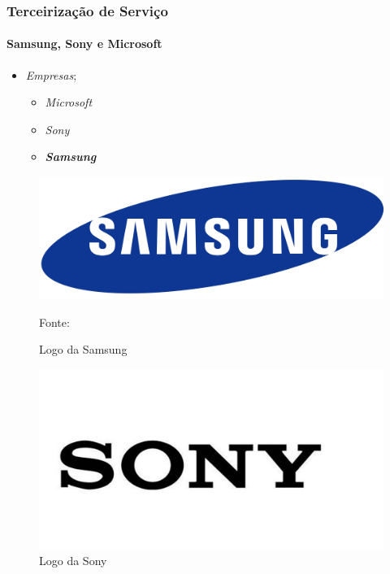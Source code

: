 \documentclass[aspectratio=169]{beamer}
\begin{document}
	\begin{frame}
		\frametitle{Terceirização de Serviço}
		\framesubtitle{Samsung, Sony e Microsoft}
		
		\begin{minipage}[!h]{.3\textwidth}
			\begin{itemize}
				\item \textit{Empresas};
				\begin{itemize}
					\item \textit{Microsoft}
					\item \textit{Sony}
					\item \textit{\textbf{Samsung}}
				\end{itemize}
			\end{itemize}
		\end{minipage}
		\hfill
		\begin{minipage}[!h]{.3\textwidth}
			\begin{figure}
				\centering
				\caption{Logo da Samsung}
				
				\includegraphics[width=.90\linewidth]{logo_samsung.png}
				
				\footnotesize{Fonte: }
				\label{logsam}
			\end{figure} 	 
		\end{minipage}
		\hfill	
		\begin{minipage}[!h]{.3\textwidth}
			\begin{figure}
				\centering
				\caption{Logo da Sony}
				
				\includegraphics[width=.65\linewidth]{logo_sony.png}
				

\end{figure}
\end{minipage}
\end{frame}
\end{document}
